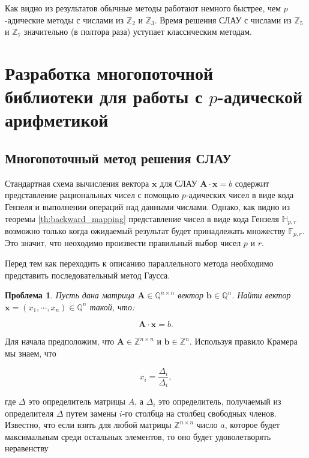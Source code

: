 \documentclass[master, och, diploma, times]{sty/SCWorks}
\theoremstyle{plain}
\newtheorem{problem}{Проблема}[section]
\theoremstyle{definition}
\begin{document}
 Как видно из результатов обычные методы работают немного быстрее, чем $p$-адические методы с числами из $\mathbb{Z}_2$ и $\mathbb{Z}_3$. Время решения СЛАУ с числами из $\mathbb{Z}_5$ и $\mathbb{Z}_7$ значительно (в полтора раза) уступает классическим методам.
 
\section{Разработка многопоточной библиотеки для работы с $p$-адической арифметикой}

\subsection{Многопоточный метод решения СЛАУ}
Стандартная схема вычисления вектора $\boldsymbol{x}$ для СЛАУ $\boldsymbol{A}\cdot \boldsymbol{x} = b$ содержит представление рациональных чисел с помощью $p$-адических чисел в виде кода Гензеля и выполнении операций над данными числами. Однако, как видно из теоремы \ref{th:backward_mapping} представление чисел в виде кода Гензеля $\mathbb{H}_{p,r}$ возможно только когда ожидаемый результат будет принадлежать множеству $\mathbb{F}_{p,r}$. Это значит, что неоходимо произвести правильный выбор чисел $p$ и $r$.


Перед тем как переходить к описанию параллельного метода необходимо представить последовательный метод Гаусса.

\begin{problem}
Пусть дана матрица $\boldsymbol{A} \in \mathbb{Q}^{n \times n}$ вектор $\boldsymbol{b} \in \mathbb{Q}^{n}$. Найти вектор $\boldsymbol{x}=(x_1,\cdots,x_n) \in \mathbb{Q}^{n}$ такой, что:

\begin{equation}
\boldsymbol{A}\cdot \boldsymbol{x} = b.
\end{equation}

\end{problem}

Для начала предположим, что $\boldsymbol{A} \in \mathbb{Z}^{n \times n}$ и $\boldsymbol{b} \in \mathbb{Z}^{n}$. Используя правило Крамера мы знаем, что 

\begin{equation}\label{formula:kramer}
x_i=\frac{\Delta_i}{\Delta_i},	
\end{equation}

\noindent где $\Delta$ это определитель матрицы $A$, а $\Delta_i$ это определитель, получаемый из определителя $\Delta$ путем замены $i$-го столбца на столбец свободных членов. Известно, что если взять для любой матрицы $\mathbb{Z}^{n \times n}$ число $a$, которое будет максимальным среди остальных элементов, то оно будет удоволетворять неравенству
\end{document}

